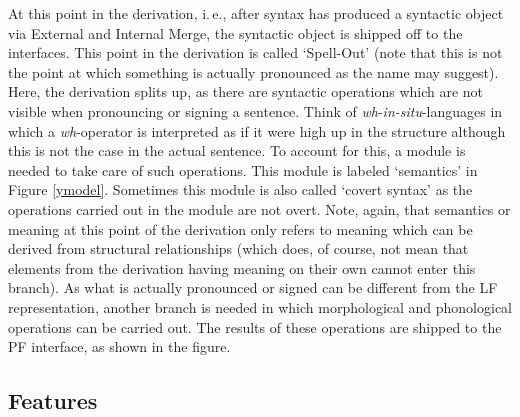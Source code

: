 At this point in the derivation, i.\,e., after syntax has produced a syntactic object via External and Internal Merge, the syntactic object is shipped off to the interfaces. This point in the derivation is called `Spell-Out' (note that this is not the point at which something is actually pronounced as the name may suggest). Here, the derivation splits up, as there are syntactic operations which are not visible when pronouncing or signing a sentence. Think of \textit{wh}-\textit{in-situ}-languages in which a \textit{wh}-operator is interpreted as if it were high up in the structure although this is not the case in the actual sentence. To account for this, a module is needed to take care of such operations. This module is labeled `semantics' in Figure \ref{ymodel}. Sometimes this module is also called `covert syntax' as the operations carried out in the module are not overt. Note, again, that semantics or meaning at this point of the derivation only refers to meaning which can be derived from structural relationships (which does, of course, not mean that elements from the derivation having meaning on their own cannot enter this branch). As what is actually pronounced or signed can be different from the LF representation, another branch is needed in which morphological and phonological operations can be carried out. The results of these operations are shipped to the PF interface, as shown in the figure.

\subsection{Features}

